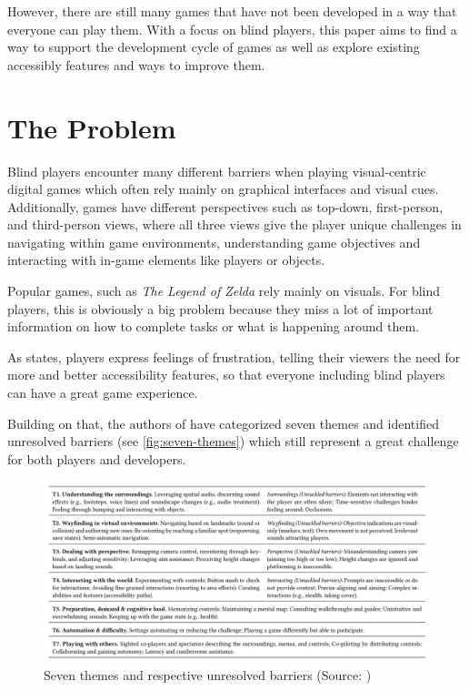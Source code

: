 \documentclass[sigconf,natbib=false,10pt]{acmart}
\begin{document}
	However, there are still many games that have not been developed in a way that everyone can play them.
	With a focus on blind players, this paper aims to find a way to support the development cycle of games as well as explore existing accessibly features and ways to improve them.
	
	\section{The Problem} \label{sec:theProblem}
	Blind players encounter many different barriers when playing visual-centric digital games which often rely mainly on graphical interfaces and visual cues. 
	Additionally, games have different perspectives such as top-down, first-person, and third-person views, where all three views give the player unique challenges in navigating within game environments, understanding game objectives and interacting with in-game elements like players or objects.
	
	Popular games, such as \emph{The Legend of Zelda} rely mainly on visuals.
	For blind players, this is obviously a big problem because they miss a lot of important information on how to complete tasks or what is happening around them.
	
	As \textcite{goncalves_my_2023} states, players express feelings of frustration, telling their viewers the need for more and better accessibility features, so that everyone including blind players can have a great game experience.
	
	Building on that, the authors of \textcite{goncalves_my_2023} have categorized seven themes and identified unresolved barriers (see \autoref{fig:seven-themes}) which still represent a great challenge for both players and developers.
	
	\begin{figure}[ht]
		\centering
		\includegraphics[scale=0.6,width=\textwidth]{assets/seven-themes.png}
		\caption{Seven themes and respective unresolved barriers (Source: \textcite{goncalves_my_2023})}
		\label{fig:seven-themes}
	\end{figure}
\end{document}
